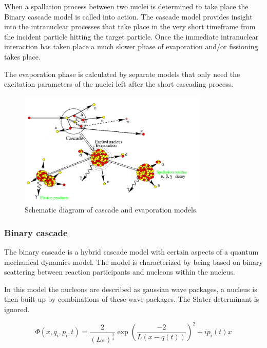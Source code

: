 When a spallation process between two nuclei is determined to take place the Binary cascade model is called into action. The cascade model provides insight into the intranuclear processes that take place in the very short timeframe from the incident particle hitting the target particle. Once the immediate intranuclear interaction has taken place a much slower phase of evaporation and/or fissioning takes place. 

The evaporation phase is calculated by separate models that only need the excitation parameters of the nuclei left after the short cascading process.

\begin{figure} 
\begin{center}
\includegraphics[width=0.8\textwidth]{images/inclScematic.png}  
\caption{\label{fig:inclschematic} Schematic diagram of cascade and evaporation models.}
 
 \end{center}
 \end{figure}

\subsubsection{Binary cascade}
The binary cascade is a hybrid cascade model with certain aspects of a quantum mechanical dynamics model. The model is characterized by being based on binary scattering between reaction participants and nucleons within the nucleus.

In this model the nucleons are described as gaussian wave packages, a nucleus is then built up by combinations of these wave-packages. The Slater determinant is ignored.


\begin{equation}
\Phi(x,q_i,p_i,t) = \frac{2}{(L\pi)^{\frac{3}{4}}}\exp{(\frac{-2}{L(x - q(t))})^2+ip_i(t)x}
\label{wavePackage}
\end{equation}


